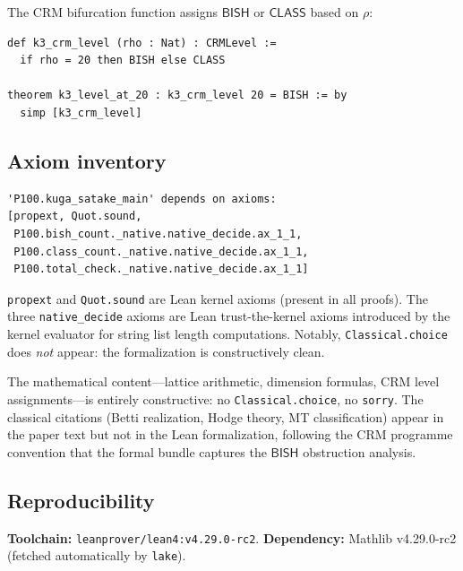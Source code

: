 \documentclass[11pt,a4paper]{article}
\theoremstyle{plain}
\theoremstyle{definition}
\newcommand{\BISH}{\textsf{BISH}}
\newcommand{\CLASS}{\textsf{CLASS}}
\begin{document}
The CRM bifurcation function assigns $\BISH$ or $\CLASS$ based on $\rho$:

\begin{tcolorbox}[leanbox={k3\_crm\_level}]
\begin{lstlisting}[style=leanstyle]
def k3_crm_level (rho : Nat) : CRMLevel :=
  if rho = 20 then BISH else CLASS

theorem k3_level_at_20 : k3_crm_level 20 = BISH := by
  simp [k3_crm_level]
\end{lstlisting}
\end{tcolorbox}

\subsection{Axiom inventory}

\begin{tcolorbox}[leanbox={\#print axioms kuga\_satake\_main}]
\begin{verbatim}
'P100.kuga_satake_main' depends on axioms:
[propext, Quot.sound,
 P100.bish_count._native.native_decide.ax_1_1,
 P100.class_count._native.native_decide.ax_1_1,
 P100.total_check._native.native_decide.ax_1_1]
\end{verbatim}
\end{tcolorbox}

\texttt{propext} and \texttt{Quot.sound} are Lean kernel axioms (present in all proofs). The three \texttt{native\_decide} axioms are Lean trust-the-kernel axioms introduced by the kernel evaluator for string list length computations. Notably, \texttt{Classical.choice} does \emph{not} appear: the formalization is constructively clean.

The mathematical content---lattice arithmetic, dimension formulas, CRM level assignments---is entirely constructive: no \texttt{Classical.choice}, no \texttt{sorry}. The classical citations (Betti realization, Hodge theory, MT classification) appear in the paper text but not in the Lean formalization, following the CRM programme convention that the formal bundle captures the $\BISH$ obstruction analysis.

\subsection{Reproducibility}

\textbf{Toolchain:} \texttt{leanprover/lean4:v4.29.0-rc2}. \textbf{Dependency:} Mathlib v4.29.0-rc2 (fetched automatically by \texttt{lake}).
\end{document}
